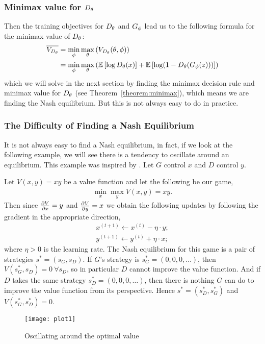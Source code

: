 \subsubsection{Minimax value for $D_\theta$}

Then the training objectives for $D_\theta$ and $G_\phi$ lead us to the
following formula for the minimax value of $D_\theta$:
\begin{align}
  \overline{V_{D_\theta}} & = \min_{\phi}\max_{\theta}\left(V_{D_\theta}(\theta,
                      \phi) \right) \\
                    & =
                      \min_{\phi}\max_{\theta}\left(\mathbb{E}\left[\log{D_\theta(x)}\right]
                      +
                      \mathbb{E}\left[\log(1 - D_\theta(G_\phi(z)))\right] \right)
\end{align}
which we will solve in the next section by finding the minimax
decision rule and minimax value for $D_\theta$ (see
Theorem~\ref{theorem:minimax}), which means we are finding the Nash
equilibrium.  But this is not always easy to do in practice.

\subsubsection{The Difficulty of Finding a Nash Equilibrium}
\label{sec:difficulty}

It is not always easy to find a Nash equilibrium, in fact, if we look
at the following example, we will see there is a tendency to oscillate
around an equilibrium. This example was inspired by
\cite{ref:weng-2017}.  Let $G$ control $x$ and $D$ control $y$.

\begin{example}
  Let $V(x, y) = xy$ be a value function and let the following be our
  game,
  \begin{align}
    \min_x\max_yV(x, y) = xy.
  \end{align}
  Then since ${\partial{V} \over \partial{x}} = y$ and
  ${\partial{V} \over \partial{y}} = x$ we obtain the following
  updates by following the gradient in the appropriate direction,
  \begin{align}
    x^{(t+1)} \gets x^{(t)} - \eta \cdot y; \\
    y^{(t+1)} \gets y^{(t)} + \eta \cdot x;
  \end{align}
  where $\eta > 0$ is the learning rate. The Nash equilibrium for this
  game is a pair of strategies $s^* = (s_G, s_D)$. If $G$'s strategy
  is $s^*_G = (0, 0, 0, \dots)$, then $V(s^*_G, s_D) = 0\ \forall s_D$, so
  in particular $D$ cannot improve the value function.  And if $D$
  takes the same strategy $s^*_D = (0, 0, 0, \dots)$, then there is
  nothing $G$ can do to improve the value function from its
  perspective.  Hence $s^* = (s^*_D, s^*_G)$ and $V(s^*_G, s^*_D) = 0$.

  \begin{figure}[H]
    \centering
    \texttt{[image: plot1]}
    \caption{Oscillating around the optimal value}
    \label{fig:alternating}
  \end{figure}
\end{example}

